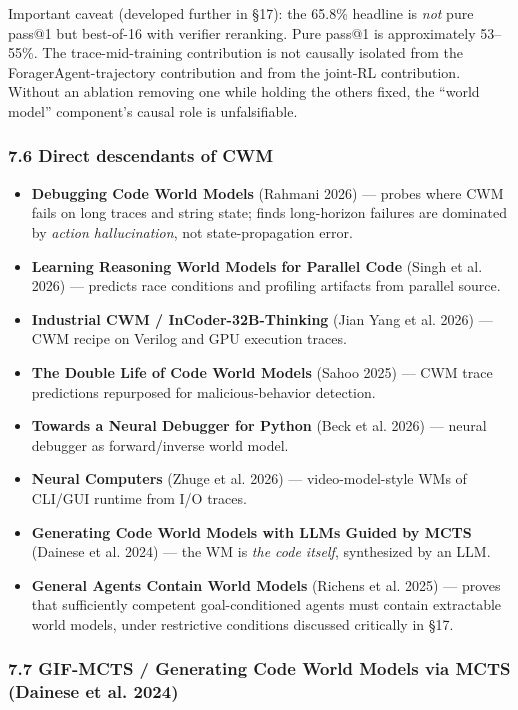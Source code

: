 \documentclass{article}
\providecommand{\tightlist}{\setlength{\itemsep}{0pt}\setlength{\parskip}{0pt}}
\begin{document}
Important caveat (developed further in §17): the 65.8\% headline is
\emph{not} pure pass@1 but best-of-16 with verifier reranking. Pure
pass@1 is approximately 53--55\%. The trace-mid-training contribution is
not causally isolated from the ForagerAgent-trajectory contribution and
from the joint-RL contribution. Without an ablation removing one while
holding the others fixed, the ``world model'' component's causal role is
unfalsifiable.

\hypertarget{direct-descendants-of-cwm}{%
\subsubsection{7.6 Direct descendants of
CWM}\label{direct-descendants-of-cwm}}

\begin{itemize}
\tightlist
\item
  \textbf{Debugging Code World Models} (Rahmani 2026) --- probes where
  CWM fails on long traces and string state; finds long-horizon failures
  are dominated by \emph{action hallucination}, not state-propagation
  error.
\item
  \textbf{Learning Reasoning World Models for Parallel Code} (Singh et
  al. 2026) --- predicts race conditions and profiling artifacts from
  parallel source.
\item
  \textbf{Industrial CWM / InCoder-32B-Thinking} (Jian Yang et al. 2026)
  --- CWM recipe on Verilog and GPU execution traces.
\item
  \textbf{The Double Life of Code World Models} (Sahoo 2025) --- CWM
  trace predictions repurposed for malicious-behavior detection.
\item
  \textbf{Towards a Neural Debugger for Python} (Beck et al. 2026) ---
  neural debugger as forward/inverse world model.
\item
  \textbf{Neural Computers} (Zhuge et al. 2026) --- video-model-style
  WMs of CLI/GUI runtime from I/O traces.
\item
  \textbf{Generating Code World Models with LLMs Guided by MCTS}
  (Dainese et al. 2024) --- the WM is \emph{the code itself},
  synthesized by an LLM.
\item
  \textbf{General Agents Contain World Models} (Richens et al. 2025) ---
  proves that sufficiently competent goal-conditioned agents must
  contain extractable world models, under restrictive conditions
  discussed critically in §17.
\end{itemize}

\hypertarget{gif-mcts-generating-code-world-models-via-mcts-arxiv2405_15383}{%
\subsubsection{7.7 GIF-MCTS / Generating Code World Models via MCTS
(Dainese et al.
2024)}\label{gif-mcts-generating-code-world-models-via-mcts-arxiv2405_15383}}
\end{document}
